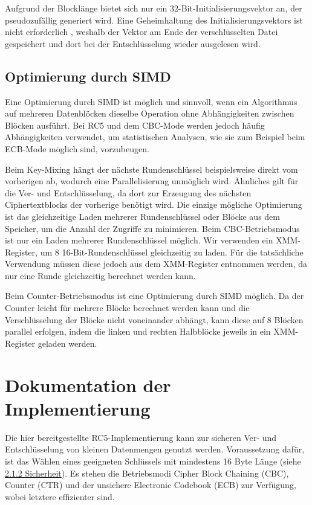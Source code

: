 \documentclass[course=erap]{aspdoc}
\begin{document}
Aufgrund der Blocklänge bietet sich nur ein 32-Bit-Initialisierungsvektor an, der pseudozufällig generiert wird.
Eine Geheimhaltung des Initialisierungsvektors ist nicht erforderlich \cite[p.194]{appcrypt}, weshalb der Vektor am Ende der verschlüsselten Datei gespeichert und dort bei der Entschlüsselung wieder ausgelesen wird.

\subsection{Optimierung durch SIMD}
Eine Optimierung durch SIMD ist möglich und sinnvoll, wenn ein Algorithmus auf mehreren Datenblöcken dieselbe Operation ohne Abhängigkeiten zwischen Blöcken ausführt. Bei RC5 und dem CBC-Mode werden jedoch häufig Abhängigkeiten verwendet, um statistischen Analysen, wie sie zum Beispiel beim ECB-Mode möglich sind, vorzubeugen.\bigbreak

Beim Key-Mixing hängt der nächste Rundenschlüssel beispielsweise direkt vom vorherigen ab, wodurch eine Parallelisierung unmöglich wird.
Ähnliches gilt für die Ver- und Entschlüsselung, da dort zur Erzeugung des nächsten Ciphertextblocks der vorherige benötigt wird. Die einzige mögliche Optimierung ist das gleichzeitige Laden mehrerer Rundenschlüssel oder Blöcke aus dem Speicher, um die Anzahl der Zugriffe zu minimieren. Beim CBC-Betriebsmodus ist nur ein Laden mehrerer Rundenschlüssel möglich. Wir verwenden ein XMM-Register, um 8 16-Bit-Rundenschlüssel gleichzeitig zu laden. Für die tatsächliche Verwendung müssen diese jedoch aus dem XMM-Register entnommen werden, da nur eine Runde gleichzeitig berechnet werden kann.\bigbreak

Beim Counter-Betriebsmodus ist eine Optimierung durch SIMD möglich. Da der Counter leicht für mehrere Blöcke berechnet werden kann und die Verschlüsselung der Blöcke nicht voneinander abhängt, kann diese auf 8 Blöcken parallel erfolgen, indem die linken und rechten Halbblöcke jeweils in ein XMM-Register geladen werden.

\section{Dokumentation der Implementierung}
Die hier bereitgestellte RC5-Implementierung kann zur sicheren Ver- und Entschlüsselung von kleinen Datenmengen genutzt werden.
Voraussetzung dafür, ist das Wählen eines geeigneten Schlüssels mit mindestens 16 Byte Länge (siehe
\hyperref[sec:Sicherheit]{2.1.2 Sicherheit}).
Es stehen die Betriebsmodi Cipher Block Chaining (CBC), Counter (CTR) und der unsichere Electronic Codebook (ECB) zur Verfügung, wobei letztere effizienter sind.\bigbreak
\end{document}
